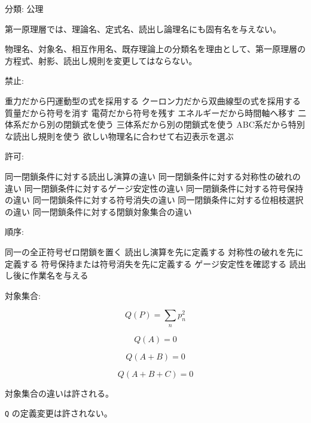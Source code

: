 \documentclass[
  a4paper,
]{ltjsarticle}
\newenvironment{Shaded}{}{}
\newcommand{\NormalTok}[1]{#1}
\begin{document}
分類: 公理

第一原理層では、理論名、定式名、読出し論理名にも固有名を与えない。

物理名、対象名、相互作用名、既存理論上の分類名を理由として、第一原理層の方程式、射影、読出し規則を変更してはならない。

禁止:

\begin{Shaded}
\begin{Highlighting}[]
\NormalTok{重力だから円運動型の式を採用する}
\NormalTok{クーロン力だから双曲線型の式を採用する}
\NormalTok{質量だから符号を消す}
\NormalTok{電荷だから符号を残す}
\NormalTok{エネルギーだから時間軸へ移す}
\NormalTok{二体系だから別の閉鎖式を使う}
\NormalTok{三体系だから別の閉鎖式を使う}
\NormalTok{ABC系だから特別な読出し規則を使う}
\NormalTok{欲しい物理名に合わせて右辺表示を選ぶ}
\end{Highlighting}
\end{Shaded}

許可:

\begin{Shaded}
\begin{Highlighting}[]
\NormalTok{同一閉鎖条件に対する読出し演算の違い}
\NormalTok{同一閉鎖条件に対する対称性の破れの違い}
\NormalTok{同一閉鎖条件に対するゲージ安定性の違い}
\NormalTok{同一閉鎖条件に対する符号保持の違い}
\NormalTok{同一閉鎖条件に対する符号消失の違い}
\NormalTok{同一閉鎖条件に対する位相枝選択の違い}
\NormalTok{同一閉鎖条件に対する閉鎖対象集合の違い}
\end{Highlighting}
\end{Shaded}

順序:

\begin{Shaded}
\begin{Highlighting}[]
\NormalTok{同一の全正符号ゼロ閉鎖を置く}
\NormalTok{読出し演算を先に定義する}
\NormalTok{対称性の破れを先に定義する}
\NormalTok{符号保持または符号消失を先に定義する}
\NormalTok{ゲージ安定性を確認する}
\NormalTok{読出し後に作業名を与える}
\end{Highlighting}
\end{Shaded}

対象集合:

\[
Q(P)=\sum_n p_n^2
\]

\[
Q(A)=0
\]

\[
Q(A+B)=0
\]

\[
Q(A+B+C)=0
\]

対象集合の違いは許される。

\texttt{Q} の定義変更は許されない。
\end{document}

